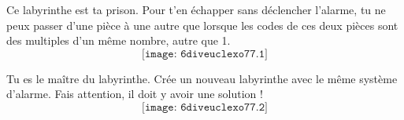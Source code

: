 Ce labyrinthe est ta prison. Pour t'en échapper sans déclencher
l'alarme, tu ne peux passer d'une pièce à une autre que lorsque les
codes de ces deux pièces sont des multiples d'un même nombre, autre
que 1.
\[\texttt{[image: 6diveuclexo77.1]}\]
\par\dotfill\par
Tu es le maître du labyrinthe. Crée un nouveau labyrinthe avec le même
système d'alarme. Fais attention, il doit y avoir une solution !
\[\texttt{[image: 6diveuclexo77.2]}\]